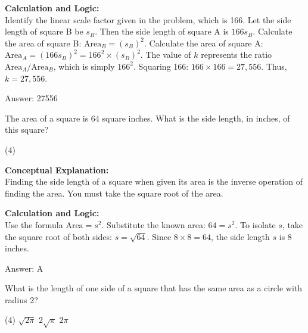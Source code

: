 \documentclass[11pt,paper=a4,answers]{exam}
\begin{document}
\begin{questions}
\begin{solution}
\vspace{30pt}

\textbf{Calculation and Logic:} \\
Identify the linear scale factor given in the problem, which is 166. Let the side length of square B be $s_B$. Then the side length of square A is $166s_B$. Calculate the area of square B: $\text{Area}_B = (s_B)^2$. Calculate the area of square A: $\text{Area}_A = (166s_B)^2 = 166^2 \times (s_B)^2$. The value of $k$ represents the ratio $\text{Area}_A / \text{Area}_B$, which is simply $166^2$. Squaring 166: $166 \times 166 = 27,556$. Thus, $k = 27,556$.

\vspace{30pt}

Answer: \colorbox{yellow!100}{27556}
\end{solution}

\vspace{60pt}

\question
The area of a square is 64 square inches. What is the side length, in inches, of this square?
\begin{tasks}(4)
\end{tasks}

\begin{solution}
\textbf{Conceptual Explanation:} \\
Finding the side length of a square when given its area is the inverse operation of finding the area. You must take the square root of the area.

\vspace{30pt}

\textbf{Calculation and Logic:} \\
Use the formula $\text{Area} = s^2$. Substitute the known area: $64 = s^2$. To isolate $s$, take the square root of both sides: $s = \sqrt{64}$. Since $8 \times 8 = 64$, the side length $s$ is 8 inches.

\vspace{30pt}

Answer: \colorbox{yellow!100}{A}
\end{solution}

\vspace{60pt}

\question
What is the length of one side of a square that has the same area as a circle with radius 2?
\begin{tasks}(4)
    \task $\sqrt{2\pi}$
    \task $2\sqrt{\pi}$
    \task $2\pi$
\end{tasks}


\end{questions}
\end{document}
